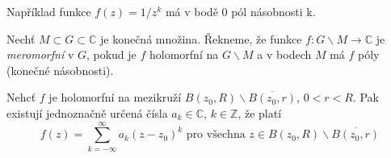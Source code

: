 Například funkce $f(z) = 1 / z^k$ má v bodě 0 pól násobnosti k.

\begin{definice}
Nechť $M \subset G \subset \mathbb{C}$ je konečná množina. Řekneme, že funkce $f : G \backslash M \rightarrow \mathbb{C}$ je \emph{meromorfní} v $G$, pokud je $f$ holomorfní na $G \backslash M$ a v bodech $M$ má $f$ póly (konečné násobnosti).
\end{definice}

\begin{vetat}
Nehcť $f$ je holomorfní na mezikruží $B(z_0, R) \backslash \overline{B(z_0, r)}$, $0 < r < R$. Pak existují jednoznačně určená čísla $a_k \in \mathbb{C}$, $k \in \mathbb{Z}$, že platí 
$$f(z) = \sum_{k= - \infty}^\infty a_k (z-z_0)^k \textrm{ pro všechna } z \in B(z_0, R) \backslash \overline{B(z_0, r)}$$
\end{vetat}